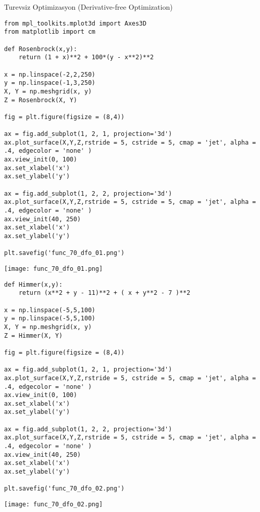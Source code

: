 \documentclass[12pt,fleqn]{article}\usepackage{../../common}
\begin{document}
Turevsiz Optimizasyon (Derivative-free Optimization)

\begin{verbatim}
from mpl_toolkits.mplot3d import Axes3D
from matplotlib import cm

def Rosenbrock(x,y):
    return (1 + x)**2 + 100*(y - x**2)**2

x = np.linspace(-2,2,250)
y = np.linspace(-1,3,250)
X, Y = np.meshgrid(x, y)
Z = Rosenbrock(X, Y)

fig = plt.figure(figsize = (8,4))

ax = fig.add_subplot(1, 2, 1, projection='3d')
ax.plot_surface(X,Y,Z,rstride = 5, cstride = 5, cmap = 'jet', alpha = .4, edgecolor = 'none' )
ax.view_init(0, 100)
ax.set_xlabel('x')
ax.set_ylabel('y')

ax = fig.add_subplot(1, 2, 2, projection='3d')
ax.plot_surface(X,Y,Z,rstride = 5, cstride = 5, cmap = 'jet', alpha = .4, edgecolor = 'none' )
ax.view_init(40, 250)
ax.set_xlabel('x')
ax.set_ylabel('y')

plt.savefig('func_70_dfo_01.png')
\end{verbatim}

\texttt{[image: func\_70\_dfo\_01.png]}

\begin{verbatim}
def Himmer(x,y):
    return (x**2 + y - 11)**2 + ( x + y**2 - 7 )**2

x = np.linspace(-5,5,100)
y = np.linspace(-5,5,100)
X, Y = np.meshgrid(x, y)
Z = Himmer(X, Y)

fig = plt.figure(figsize = (8,4))

ax = fig.add_subplot(1, 2, 1, projection='3d')
ax.plot_surface(X,Y,Z,rstride = 5, cstride = 5, cmap = 'jet', alpha = .4, edgecolor = 'none' )
ax.view_init(0, 100)
ax.set_xlabel('x')
ax.set_ylabel('y')

ax = fig.add_subplot(1, 2, 2, projection='3d')
ax.plot_surface(X,Y,Z,rstride = 5, cstride = 5, cmap = 'jet', alpha = .4, edgecolor = 'none' )
ax.view_init(40, 250)
ax.set_xlabel('x')
ax.set_ylabel('y')

plt.savefig('func_70_dfo_02.png')
\end{verbatim}

\texttt{[image: func\_70\_dfo\_02.png]}
\end{document}
